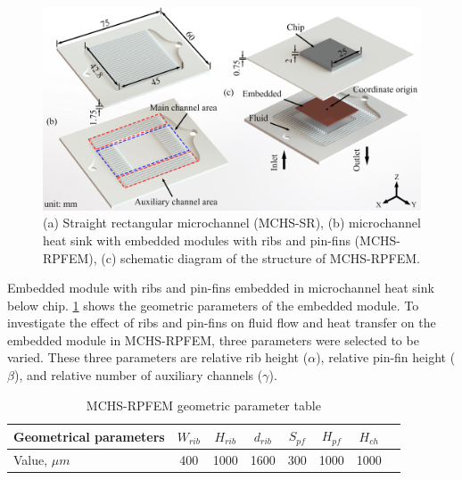 \begin{figure}[htbp] %
    \centering %
    \scriptsize %
    \includegraphics[width=1 \textwidth]{Schematic.jpg} %
    \caption{
        (a) Straight rectangular microchannel (MCHS-SR),
        (b) microchannel heat sink with embedded modules with ribs and pin-fins (MCHS-RPFEM),
        (c) schematic diagram of the structure of MCHS-RPFEM.}
    \label{fig:structure}
\end{figure}
Embedded module with ribs and pin-fins embedded in microchannel heat sink below chip.
\cref{tab:structure-parameter} shows the geometric parameters of the embedded module.
To investigate the effect of ribs and pin-fins on fluid flow and heat transfer on the embedded module in MCHS-RPFEM, three parameters were selected to be varied.
These three parameters are relative rib height ($\alpha$), relative pin-fin height ($\beta$), and relative number of auxiliary channels ($\gamma$).

\begin{table}[htbp]
    \centering
    \scriptsize
    \caption{MCHS-RPFEM geometric parameter table}
    \begin{tabular}{lccccccc}
        \toprule
        Geometrical parameters & $W_{rib}$ & $H_{rib}$ & $d_{rib}$ & $S_{pf}$ & $H_{pf}$ & $H_{ch}$ \\
        \midrule
        Value, $\mu m$         & 400       & 1000      & 1600      & 300      & 1000     & 1000     \\
        \bottomrule
    \end{tabular}
    \label{tab:structure-parameter}
\end{table}